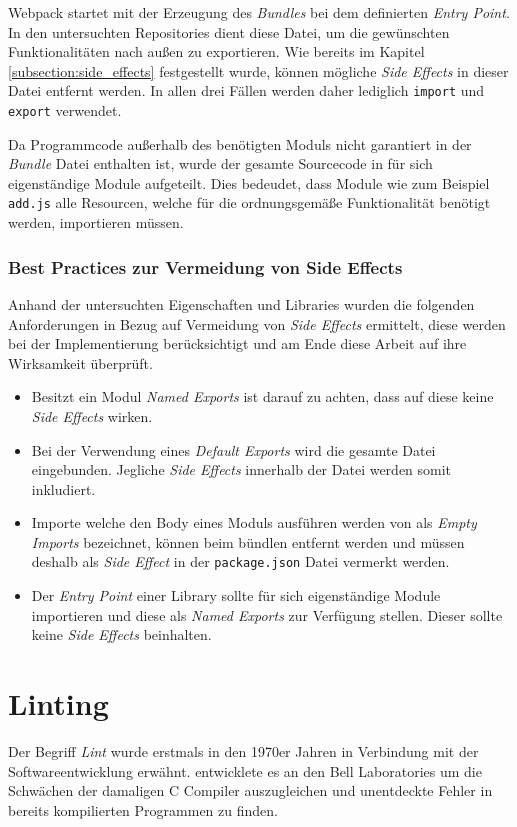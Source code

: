 Webpack startet mit der Erzeugung des \textit{Bundles} bei dem definierten \textit{Entry Point}. In den untersuchten Repositories dient diese Datei, um die gewünschten Funktionalitäten nach außen zu exportieren. Wie bereits im Kapitel \ref{subsection:side_effects} festgestellt wurde, können mögliche \textit{Side Effects} in dieser Datei entfernt werden. In allen drei Fällen werden daher lediglich \lstinline{import} und \lstinline{export} verwendet.

Da Programmcode außerhalb des benötigten Moduls nicht garantiert in der \textit{Bundle} Datei enthalten ist, wurde der gesamte Sourcecode in für sich eigenständige Module aufgeteilt. Dies bedeudet, dass Module wie zum Beispiel \lstinline{add.js} alle Resourcen, welche für die ordnungsgemäße Funktionalität benötigt werden, importieren müssen.

\subsubsection{Best Practices zur Vermeidung von Side Effects}
\label{subsubsection:best_practices}

Anhand der untersuchten Eigenschaften und Libraries wurden die folgenden Anforderungen in Bezug auf Vermeidung von \textit{Side Effects} ermittelt, diese werden bei der Implementierung berücksichtigt und am Ende diese Arbeit auf ihre Wirksamkeit überprüft.

\begin{itemize}
\item Besitzt ein Modul \textit{Named Exports} ist darauf zu achten, dass auf diese keine \textit{Side Effects} wirken.
\item Bei der Verwendung eines \textit{Default Exports} wird die gesamte Datei eingebunden. Jegliche \textit{Side Effects} innerhalb der Datei werden somit inkludiert.
\item Importe welche den Body eines Moduls ausführen werden von \textcite{Rauschmayer2018} als \textit{Empty Imports} bezeichnet, können beim bündlen entfernt werden und müssen deshalb als \textit{Side Effect} in der \lstinline{package.json} Datei vermerkt werden.
\item Der \textit{Entry Point} einer Library sollte für sich eigenständige Module importieren und diese als \textit{Named Exports} zur Verfügung stellen. Dieser sollte keine \textit{Side Effects} beinhalten.
\end{itemize}

\section{Linting}
Der Begriff \textit{Lint} wurde erstmals in den 1970er Jahren in Verbindung mit der Softwareentwicklung erwähnt. \textcite{Johnson1978} entwicklete es an den Bell Laboratories um die Schwächen der damaligen C Compiler auszugleichen und unentdeckte Fehler in bereits kompilierten Programmen zu finden.

